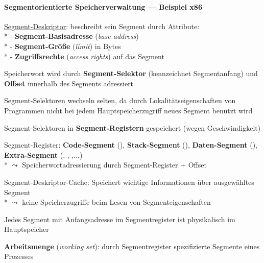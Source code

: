 \newpage

\paragraph{Segmentorientierte Speicherverwaltung --- Beispiel x86}
\begin{items}
  \item \underline{Segment-Deskriptor}: beschreibt sein Segment durch Attribute: \\*
    - \textbf{Segment-Basisadresse} (\emph{base address}) \\*
    - \textbf{Segment-Größe} (\emph{limit}) in Bytes \\*
    - \textbf{Zugriffsrechte} (\emph{access rights}) auf das Segment
  \item Speicherwort wird durch \textbf{Segment-Selektor} (kennzeichnet Segmentanfang) und \textbf{Offset} innerhalb des Segments adressiert
  \item Segment-Selektoren wechseln selten, da durch Lokalitätseigenschaften von Programmen nicht bei jedem Hauptspeicherzugriff neues Segment benutzt wird
  \item Segment-Selektoren in \textbf{Segment-Registern} gespeichert (wegen Geschwindigkeit)
  \item Segment-Register: \textbf{Code-Segment} (), \textbf{Stack-Segment} (), \textbf{Daten-Segment} (), \textbf{Extra-Segment} (, , ,...) \\*
    \( \leadsto \) Speicherwortadressierung durch Segment-Register + Offset
  \item Segment-Deskriptor-Cache: Speichert wichtige Informationen über ausgewähltes Segment \\*
    \( \leadsto \) keine Speicherzugriffe beim Lesen von Segmenteigenschaften
  \item Jedes Segment mit Anfangsadresse im Segmentregister ist physikalisch im Hauptspeicher
  \item \textbf{Arbeitsmenge} (\emph{working set}): durch Segmentregister spezifizierte Segmente eines Prozesses
\end{items}

